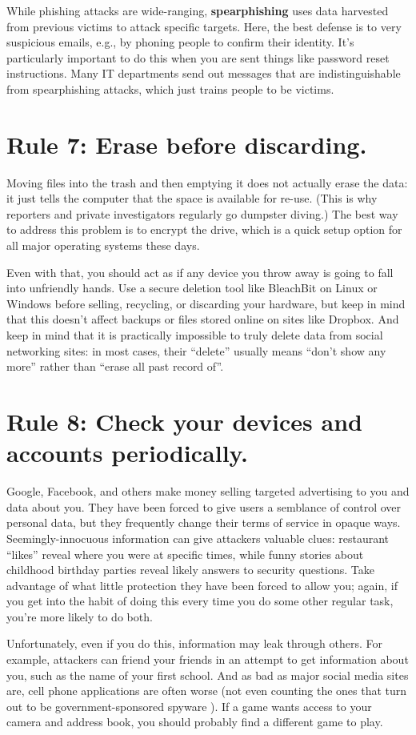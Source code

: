 \documentclass[10pt,letterpaper]{article}
\newcommand{\rulemajor}[1]{\section*{#1}}
\begin{document}
While phishing attacks are wide-ranging,
\textbf{spearphishing} uses data harvested from previous victims to attack specific targets.
Here,
the best defense is to very suspicious emails,
e.g., by phoning people to confirm their identity.
It's particularly important to do this when you are sent
things like password reset instructions.
Many IT departments send out messages that are indistinguishable from spearphishing attacks,
which just trains people to be victims.

\rulemajor{Rule 7: Erase before discarding.}

Moving files into the trash and then emptying it does not actually erase the data:
it just tells the computer that the space is available for re-use.
(This is why reporters and private investigators regularly go dumpster diving.)
The best way to address this problem is to encrypt the drive,
which is a quick setup option for all major operating systems these days.

Even with that,
you should act as if any device you throw away is going to fall into unfriendly hands.
Use a secure deletion tool like BleachBit on Linux or Windows
before selling, recycling, or discarding your hardware,
but keep in mind that this doesn't affect backups or files stored online
on sites like Dropbox.
And keep in mind that it is practically impossible to truly delete data from social networking sites:
in most cases,
their ``delete'' usually means ``don't show any more''
rather than ``erase all past record of''.

\rulemajor{Rule 8: Check your devices and accounts periodically.}

Google, Facebook, and others make money selling targeted advertising to you and data about you.
They have been forced to give users a semblance of control over personal data,
but they frequently change their terms of service in opaque ways.
Seemingly-innocuous information can give attackers valuable clues:
restaurant ``likes'' reveal where you were at specific times,
while funny stories about childhood birthday parties reveal likely answers to security questions.
Take advantage of what little protection they have been forced to allow you;
again,
if you get into the habit of doing this every time you do some other regular task,
you're more likely to do both.

Unfortunately,
even if you do this,
information may leak through others.
For example,
attackers can friend your friends in an attempt to get information about you,
such as the name of your first school.
And as bad as major social media sites are,
cell phone applications are often worse
(not even counting the ones that turn out to be government-sponsored spyware \cite{Schn2019}).
If a game wants access to your camera and address book,
you should probably find a different game to play.
\end{document}
